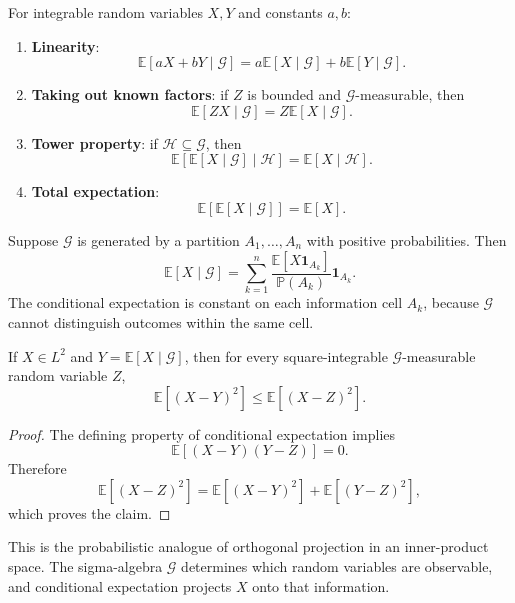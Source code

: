 \begin{theorem}
For integrable random variables $X,Y$ and constants $a,b$:
\begin{enumerate}
    \item \textbf{Linearity}:
    \[
        \mathbb{E}[aX+bY\mid\mathcal{G}]
        =a\mathbb{E}[X\mid\mathcal{G}]
        +b\mathbb{E}[Y\mid\mathcal{G}].
    \]
    \item \textbf{Taking out known factors}: if $Z$ is bounded and $\mathcal{G}$-measurable, then
    \[
        \mathbb{E}[ZX\mid\mathcal{G}]
        =Z\mathbb{E}[X\mid\mathcal{G}].
    \]
    \item \textbf{Tower property}: if $\mathcal{H}\subseteq\mathcal{G}$, then
    \[
        \mathbb{E}[\mathbb{E}[X\mid\mathcal{G}]\mid\mathcal{H}]
        =\mathbb{E}[X\mid\mathcal{H}].
    \]
    \item \textbf{Total expectation}:
    \[
        \mathbb{E}[\mathbb{E}[X\mid\mathcal{G}]]=\mathbb{E}[X].
    \]
\end{enumerate}
\end{theorem}

\newpage

\begin{example}
Suppose $\mathcal{G}$ is generated by a partition $A_1,\dots,A_n$ with positive probabilities. Then
\[
    \mathbb{E}[X\mid\mathcal{G}]
    =\sum_{k=1}^n
    \frac{\mathbb{E}[X\mathbf{1}_{A_k}]}{\mathbb{P}(A_k)}
    \mathbf{1}_{A_k}.
\]
The conditional expectation is constant on each information cell $A_k$, because $\mathcal{G}$ cannot distinguish outcomes within the same cell.
\end{example}

\begin{theorem}
If $X\in L^2$ and $Y=\mathbb{E}[X\mid\mathcal{G}]$, then for every square-integrable $\mathcal{G}$-measurable random variable $Z$,
\[
    \mathbb{E}[(X-Y)^2]
    \leq
    \mathbb{E}[(X-Z)^2].
\]
\end{theorem}

\begin{proof}
The defining property of conditional expectation implies
\[
    \mathbb{E}[(X-Y)(Y-Z)]=0.
\]
Therefore
\[
    \mathbb{E}[(X-Z)^2]
    =\mathbb{E}[(X-Y)^2]
     +\mathbb{E}[(Y-Z)^2],
\]
which proves the claim.
\end{proof}

\begin{remark}
This is the probabilistic analogue of orthogonal projection in an inner-product space. The sigma-algebra $\mathcal{G}$ determines which random variables are observable, and conditional expectation projects $X$ onto that information.
\end{remark}

